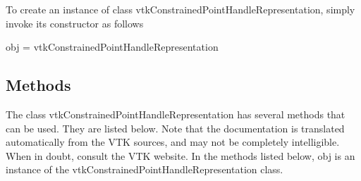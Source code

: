 To create an instance of class vtk\-Constrained\-Point\-Handle\-Representation, simply invoke its constructor as follows \begin{DoxyVerb}  obj = vtkConstrainedPointHandleRepresentation
\end{DoxyVerb}
 \hypertarget{vtkwidgets_vtkxyplotwidget_Methods}{}\subsection{Methods}\label{vtkwidgets_vtkxyplotwidget_Methods}
The class vtk\-Constrained\-Point\-Handle\-Representation has several methods that can be used. They are listed below. Note that the documentation is translated automatically from the V\-T\-K sources, and may not be completely intelligible. When in doubt, consult the V\-T\-K website. In the methods listed below, {\ttfamily obj} is an instance of the vtk\-Constrained\-Point\-Handle\-Representation class. 
